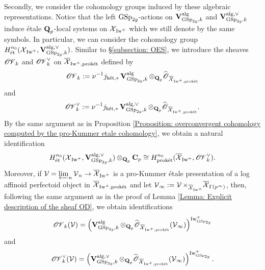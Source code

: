 Secondly, we consider the cohomology groups induced by these algebraic representations. Notice that the left $\GSp_{2g}$-actions on $\V_{\GSp_{2g}, k}^{\alg}$ and $\V_{\GSp_{2g}, k}^{\alg, \vee}$ induce \'etale $\Q_p$-local systems on $\calX_{\Iw^+}$ which we still denote by the same symbols. In particular, we can consider the cohomology group $H_{\et}^{n_0}(\calX_{\Iw^+}, \V_{\GSp_{2g}, k}^{\alg, \vee})$. Similar to \S \ref{subsection: OES}, we introduce the sheaves $\sheafOV_k$ and $\sheafOV_k^{\vee}$ on $\overline{\calX}_{\Iw^+, \proket}$ defined by
$$
 \sheafOV_{k} := \nu^{-1}j_{\ket, *}\V_{\GSp_{2g}, k}^{\alg}\otimes_{\Q_p} \widehat{\scrO}_{\overline{\calX}_{\Iw^+, \proket}}
$$
and
$$
 \sheafOV_{k}^{\vee} := \nu^{-1}j_{\ket, *}\V_{\GSp_{2g}, k}^{\alg, \vee}\otimes_{\Q_p} \widehat{\scrO}_{\overline{\calX}_{\Iw^+, \proket}}.
$$
By the same argument as in Proposition \ref{Proposition: overconvergent cohomology computed by the pro-Kummer etale cohomology}, we obtain a natural identification
$$
H_{\et}^{n_0}(\calX_{\Iw^+}, \V_{\GSp_{2g}, k}^{\alg, \vee})\otimes_{\Q_p}\C_p \cong H_{\proket}^{n_0}(\overline{\calX}_{\Iw^+}, \sheafOV_k^{\vee}).
$$
Moreover, if $\calV = \varprojlim_{n}\calV_n \rightarrow \overline{\calX}_{\Iw^+}$ is a pro-Kummer \'etale presentation of a log affinoid perfectoid object in $\overline{\calX}_{\Iw^+, \proket}$ and let $\calV_{\infty} := \calV \times_{\overline{\calX}_{\Iw^+}}\overline{\calX}_{\Gamma(p^{\infty})}$, then, following the same argument as in the proof of Lemma \ref{Lemma: Explicit description of the sheaf OD}, we obtain identifications 
$$
\sheafOV_{k}(\calV) = \left(\V_{\GSp_{2g}, k}^{\alg}\otimes_{\Q_p} \widehat{\scrO}_{\overline{\calX}_{\Iw^+, \proket}}(\calV_{\infty})\right)^{\Iw_{\GSp_{2g}}^+}
$$
and
$$
\sheafOV_{k}^{\vee}(\calV) = \left(\V_{\GSp_{2g}, k}^{\alg, \vee}\otimes_{\Q_p} \widehat{\scrO}_{\overline{\calX}_{\Iw^+, \proket}}(\calV_{\infty})\right)^{\Iw_{\GSp_{2g}}^+}.
$$

